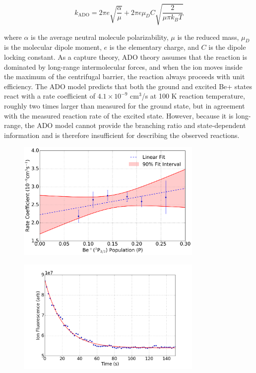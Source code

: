 \begin{equation}
	k_{\text{ADO}} = 2 \pi e \sqrt{\frac{\alpha}{\mu}} + 2 \pi e \mu_D C \sqrt{\frac{2}{\mu \pi k_B T}}
\end{equation}

where $\alpha$ is the average neutral molecule polarizability, $\mu$ is the reduced mass, $\mu_D$ is the molecular dipole moment, $e$ is the elementary charge, and $C$ is the dipole locking constant. As a capture theory, ADO theory assumes that the reaction is dominated by long-range intermolecular forces, and when the ion moves inside the maximum of the centrifugal barrier, the reaction always proceeds with unit efficiency. The ADO model predicts that both the ground and excited Be+ states react with a rate coefficient of $4.1 \times 10^{-9}$ cm$^3$/s at 100 K reaction temperature, roughly two times larger than measured for the ground state, but in agreement with the measured reaction rate of the excited state. However, because it is long-range, the ADO model cannot provide the branching ratio and state-dependent information and is therefore insufficient for describing the observed reactions.

\begin{figure}
	\centering
	\includegraphics[width=0.8\textwidth]{images/Be_H2O_p_state.png}
	\caption{}
	\label{fig: Be+H2O P-state}
\end{figure}

\begin{figure}
	\centering
	\includegraphics[width=0.8\textwidth]{images/Be_H2O_fluorescence.png}
	\caption{}
	\label{fig: Be+H2O fluorescence}
\end{figure}